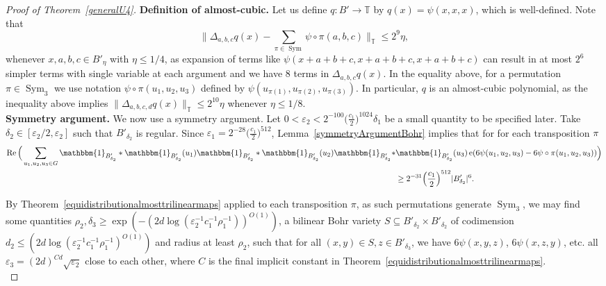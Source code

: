 \documentclass[a4paper,11pt]{article}
\numberwithin{theorem}{section}
\theoremstyle{definition}
\newcommand\id{\mathbbm{1}}
\newcommand{\on}[1]{
	\operatorname{#1}
}
\begin{document}
\begin{proof}[Proof of Theorem~\ref{generalU4}]
    \noindent\textbf{Definition of almost-cubic.} Let us define $q : B' \to \mathbb{T}$ by $q(x) = \psi(x,x,x)$, which is well-defined. Note that 
    \begin{equation}\Big\|\Delta_{a,b,c}q(x) - \sum_{\pi \in \on{Sym}} \psi \circ \pi(a,b,c)\Big\|_{\mathbb{T}} \leq 2^9\eta,\label{almostcubicderivativerelationship}\end{equation}
    whenever $x, a,b,c \in B'_\eta$ with $\eta \leq 1/4$, as expansion of terms like $\psi(x + a + b + c, x + a + b + c, x + a + b + c)$ can result in at most $2^6$ simpler terms with single variable at each argument and we have 8 terms in $\Delta_{a,b,c}q(x)$. In the equality above, for a permutation $\pi \in \on{Sym}_3$ we use notation $\psi \circ \pi(u_1, u_2, u_3)$ defined by $\psi(u_{\pi(1)}, u_{\pi(2)}, u_{\pi(3)})$. In particular, $q$ is an almost-cubic polynomial, as the inequality above implies $\Big\|\Delta_{a,b,c,d}q(x)\Big\|_{\mathbb{T}} \leq 2^{10}\eta$ whenever $\eta \leq 1/8$.\\
    
    \noindent\textbf{Symmetry argument.} We now use a symmetry argument. Let $0 < \varepsilon_2 < 2^{-100}\Big(\frac{c_1}{2}\Big)^{1024}\delta_1$ be a small quantity to be specified later. Take $\delta_2\in [\varepsilon_2/2, \varepsilon_2]$ such that $B'_{\delta_2}$ is regular. Since $\varepsilon_1 = 2^{-28}\Big(\frac{c_1}{2}\Big)^{512}$, Lemma~\ref{symmetryArgumentBohr} implies that for for each transposition $\pi$ 
     \begin{align*}\on{Re}\Big(\sum_{u_1, u_2, u_3 \in G} \id_{B'_{\delta_2}} \ast \id_{B'_{\delta_2}}(u_1)\id_{B'_{\delta_2}} \ast \id_{B'_{\delta_2}}(u_2)\id_{B'_{\delta_2}} \ast &\id_{B'_{\delta_2}}(u_3) \on{e}(6\psi(u_1, u_2, u_3) - 6 \psi\circ\pi(u_1, u_2, u_3)) \Big)\\
     &\geq 2^{-31}\Big(\frac{c_1}{2}\Big)^{512}|B'_{\delta_2}|^6.\end{align*}

    By Theorem~\ref{equidistributionalmosttrilinearmaps} applied to each transposition $\pi$, as such permutations generate $\on{Sym}_3$, we may find some quantities $\rho_2, \delta_3 \geq \exp(-(2d \log(\varepsilon_2^{-1} c_1^{-1} \rho_1^{-1}))^{O(1)})$, a bilinear Bohr variety $S \subseteq B'_{\delta_2} \times B'_{\delta_2}$ of codimension $d_2 \leq (2d \log(\varepsilon_2^{-1} c_1^{-1}\rho_1^{-1})^{O(1)})$ and radius at least $\rho_2$, such that for all $(x,y) \in S, z \in B'_{\delta_3}$, we have $6\psi(x,y,z)$, $6\psi(x, z, y)$, etc. all $\varepsilon_3 = (2d)^{Cd}\sqrt{\varepsilon_2}$ close to each other, where $C$ is the final implicit constant in Theorem~\ref{equidistributionalmosttrilinearmaps}.\\


\end{proof}
\end{document}
